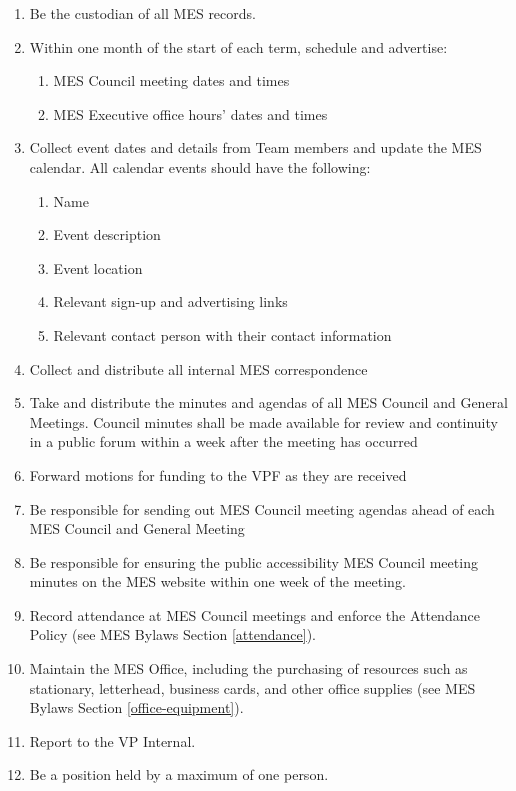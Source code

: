 \begin{enumerate}
 \item
  Be the custodian of all MES records.
 \item
  Within one month of the start of each term, schedule and advertise:

  \begin{enumerate}
   \item
    MES Council meeting dates and times
   \item
    MES Executive office hours' dates and times
  \end{enumerate}
 \item
  Collect event dates and details from Team members and update the MES calendar. All calendar events should have the following:

  \begin{enumerate}
   \item
    Name
   \item
    Event description
   \item
    Event location
   \item
    Relevant sign-up and advertising links
   \item
    Relevant contact person with their contact information
  \end{enumerate}
 \item
  Collect and distribute all internal MES correspondence
 \item
  Take and distribute the minutes and agendas of all MES Council and General Meetings. Council minutes shall be made available for review and continuity in a public forum within a week after the meeting has occurred
 \item
  Forward motions for funding to the VPF as they are received
 \item
  Be responsible for sending out MES Council meeting agendas ahead of each MES Council and General Meeting
 \item
  Be responsible for ensuring the public accessibility MES Council meeting minutes on the MES website within one week of the meeting.
 \item
  Record attendance at MES Council meetings and enforce the Attendance Policy (see MES Bylaws Section \ref{attendance}).
 \item
  Maintain the MES Office, including the purchasing of resources such as stationary, letterhead, business cards, and other office supplies (see MES Bylaws Section \ref{office-equipment}).
 \item
  Report to the VP Internal.
 \item
  Be a position held by a maximum of one person.

\end{enumerate}

